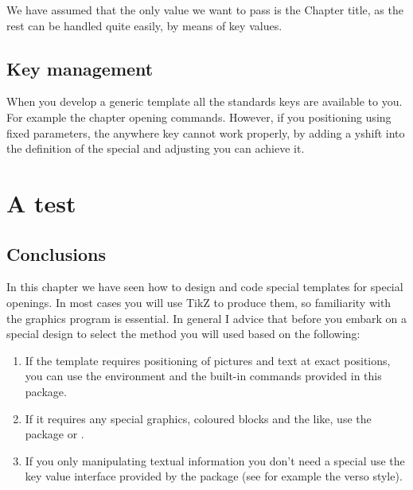 We have assumed that the only value we want to pass is the Chapter title, as the rest can be handled quite easily, by means of key values.

\section{Key management}

When you develop a generic template all the standards keys are available to you. For example the chapter opening commands. However, if you positioning using fixed parameters, the anywhere key cannot work properly, by adding a yshift into the definition of the special and adjusting you can achieve it.

\newpage

\chapter{A test}

\section{Conclusions}

In this chapter we have seen how to design and code special templates for special openings. In most cases you will use TikZ to produce them, so familiarity with the graphics program is essential. In general I advice that before you embark on a special design to select the method you will used based on the following:

\begin{enumerate}
\item If the template requires positioning of pictures and text at exact positions, you can use the 
         environment and the built-in commands provided in this package.
\item If it requires any special graphics, coloured blocks and the like, use the  package or .
\item If you only manipulating textual information you don't need a special use the key value interface provided by the package (see for example the verso style).
\end{enumerate}
 









 












